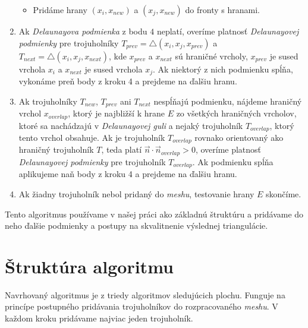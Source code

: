 \begin{enumerate}
{\begin{itemize}
        \item{Pridáme hrany $(x_i, x_{new})$ a 
        $(x_j, x_{new})$ do fronty s hranami.}
    \end{itemize}
    }
    \item{
        Ak \textit{Delaunayova podmienka} z bodu $4$ neplatí, overíme platnosť \textit{Delaunayovej podmienky} 
        pre trojuholníky 
        $T_{prev} = \bigtriangleup(x_i, x_j, x_{prev})$ a 
        $T_{next} = \bigtriangleup(x_i, x_j, x_{next})$, kde 
        $x_{prev}$ a $x_{next}$ sú hraničné vrcholy, $x_{prev}$ 
        je sused vrchola $x_i$ a $x_{next}$ je sused vrchola 
        $x_j$. Ak niektorý z nich podmienku
        spĺňa, vykonáme preň body z kroku 4 a prejdeme na ďalšiu hranu.
    }
    \item{
        Ak trojuholníky $T_{new}$, $T_{prev}$ ani $T_{next}$ nespĺňajú podmienku,
        nájdeme hraničný vrchol $x_{overlap}$, ktorý je najbližší k hrane $E$ zo všetkých hraničných
        vrcholov, ktoré sa nachádzajú v \textit{Delaunayovej guli}
        a nejaký trojuholník $T_{overlap}$, ktorý tento vrchol obsahuje.
        Ak je trojuholník $T_{overlap}$ rovnako orientovaný ako hraničný 
        trojuholník $T$, teda platí $\vec{n} \cdot \vec{n}_{overlap} > 0$,
        overíme platnosť \textit{Delaunayovej podmienky} pre 
        trojuholník $T_{overlap}$. Ak podmienku spĺňa aplikujeme naň body z 
        kroku 4 a prejdeme na ďalšiu hranu.
    }
    \item{
        Ak žiadny trojuholník nebol pridaný do \textit{meshu}, testovanie hrany $E$ skončíme.
    }
\end{enumerate}

Tento algoritmus používame v našej práci ako základnú štruktúru a pridávame do neho ďalšie podmienky 
a postupy na skvalitnenie výslednej triangulácie. 

\section {Štruktúra algoritmu}
\label{kap:first_part_of_algorithm}

Navrhovaný algoritmus je z triedy algoritmov sledujúcich plochu.
Funguje na princípe postupného pridávania trojuholníkov do rozpracovaného \textit{meshu}. V každom kroku
pridávame najviac jeden trojuholník.

